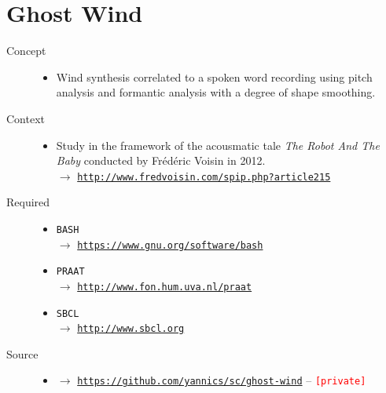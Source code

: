 
\section*{Ghost Wind}

\thispagestyle{empty}

\bigskip

\begin{description}
\item[Concept] \hfill 
\begin{itemize}
\item[] Wind synthesis correlated to a spoken word recording using pitch analysis and formantic analysis with a degree of shape smoothing.
\end{itemize}
\bigskip
\item[Context] \hfill 
\begin{itemize}
\item[] Study in the framework of the acousmatic tale \textit{The Robot And The Baby} conducted by Fr\'{e}d\'{e}ric Voisin in 2012. \\
$\rightarrow$ \href{http://www.fredvoisin.com/spip.php?article215}{\texttt{\small http://www.fredvoisin.com/spip.php?article215}}
\end{itemize}
\bigskip
\item[Required] \hfill 
\begin{itemize}
\setlength\itemsep{1em}
\item[] \texttt{BASH} \\ $\rightarrow$ \href{https://www.gnu.org/software/bash}{\texttt{\small https://www.gnu.org/software/bash}}
\item[] \texttt{PRAAT} \\ $\rightarrow$ \href{http://www.fon.hum.uva.nl/praat}{\texttt{\small http://www.fon.hum.uva.nl/praat}} 
\item[] \texttt{SBCL} \\ $\rightarrow$ \href{http://www.sbcl.org}{\texttt{\small http://www.sbcl.org}}
\end{itemize}
\bigskip
\item[Source] \hfill 
\begin{itemize}
\item[] $\rightarrow$ \href{https://github.com/yannics/sc/ghost-wind}{\texttt{\small https://github.com/yannics/sc/ghost-wind}} -- \texttt{\textcolor{red}{\small[private]}}
\end{itemize}

\end{description}

